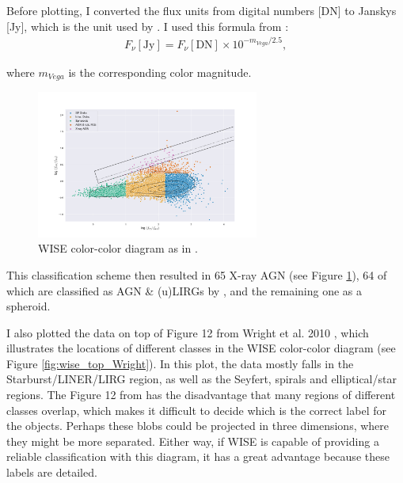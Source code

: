 \documentclass[letterpaper, oneside]{article}
\begin{document}
	Before plotting, I converted the flux units from digital numbers [DN] to Janskys [Jy], which is the unit used by \cite{Mateos_2012, Mateos_2013}. I used this formula from \cite{wise_data_pre}:
	\begin{align}
		F_\nu [\text{Jy}] = F_\nu [\text{DN}] \times 10^{- m_{Vega} / 2.5} , 
	\end{align}

	\noindent where $m_{Vega}$ is the corresponding color magnitude.
	
	\begin{figure}[H]
	\centering
		\includegraphics[width=0.65\textwidth]{../WISE_plots/wise_final_label.pdf}
		\caption{WISE color-color diagram as in \cite{Mateos_2012, Mateos_2013}.}
		\label{fig:wise_fluxes_Xray_wedge}
	\end{figure}

	This classification scheme then resulted in 65 X-ray AGN (see Figure \ref{fig:wise_fluxes_Xray_wedge}), 64 of which are classified as AGN \& (u)LIRGs by \cite{Jarrett_2017}, and the remaining one as a spheroid.
	
	I also plotted the data on top of Figure 12 from Wright et al. 2010 \cite{Wright_2010}, which illustrates the locations of different classes in the WISE color-color diagram (see Figure \ref{fig:wise_top_Wright}). In this plot, the data mostly falls in the Starburst/LINER/LIRG region, as well as the Seyfert, spirals and elliptical/star regions. The Figure 12 from \cite{Wright_2010} has the disadvantage that many regions of different classes overlap, which makes it difficult to decide which is the correct label for the objects. Perhaps these blobs could be projected in three dimensions, where they might be more separated. Either way, if WISE is capable of providing a reliable classification with this diagram, it has a great advantage because these labels are detailed.
\end{document}
